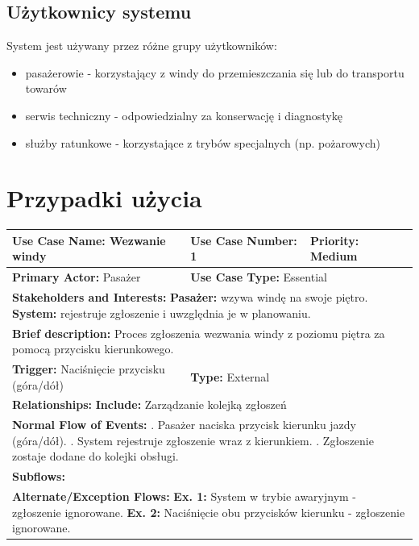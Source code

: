 \documentclass[a4paper,12pt]{article}
\begin{document}
\subsection{Użytkownicy systemu}
System jest używany przez różne grupy użytkowników:
\begin{itemize}
    \item pasażerowie - korzystający z windy do przemieszczania się lub do transportu towarów
    \item serwis techniczny - odpowiedzialny za konserwację i diagnostykę
    \item służby ratunkowe - korzystające z trybów specjalnych (np. pożarowych)
\end{itemize}
\pagebreak
\section{Przypadki użycia}

\begin{table}[h]
\centering
\begin{tabular}{|p{}|p{}|p{}|}
\hline
\textbf{Use Case Name:} Wezwanie windy & \textbf{Use Case Number:} 1 & \textbf{Priority:} Medium \\ \hline
\textbf{Primary Actor:} Pasażer & \multicolumn{2}{l|}{\textbf{Use Case Type:} Essential} \\ \hline
\multicolumn{3}{|p{0.9\textwidth}|}{\textbf{Stakeholders and Interests:} \newline
\textbf{Pasażer:} wzywa windę na swoje piętro. \newline
\textbf{System:} rejestruje zgłoszenie i uwzględnia je w planowaniu.} \\ \hline
\multicolumn{3}{|p{0.9\textwidth}|}{\textbf{Brief description:} Proces zgłoszenia wezwania windy z poziomu piętra za pomocą przycisku kierunkowego.} \\ \hline
\textbf{Trigger:} Naciśnięcie przycisku (góra/dół) & \multicolumn{2}{l|}{\textbf{Type:} External} \\ \hline
\multicolumn{3}{|p{0.9\textwidth}|}{\textbf{Relationships:} \newline
\textbf{Include:} Zarządzanie kolejką zgłoszeń } \\ \hline
\multicolumn{3}{|p{0.9\textwidth}|}{\textbf{Normal Flow of Events:} \newline
1. Pasażer naciska przycisk kierunku jazdy (góra/dół). \newline
2. System rejestruje zgłoszenie wraz z kierunkiem. \newline
3. Zgłoszenie zostaje dodane do kolejki obsługi.} \\ \hline
\multicolumn{3}{|p{0.9\textwidth}|}{\textbf{Subflows:}} \\ \hline
\multicolumn{3}{|p{0.9\textwidth}|}{\textbf{Alternate/Exception Flows:} \newline
\textbf{Ex. 1:} System w trybie awaryjnym - zgłoszenie ignorowane. \newline
\textbf{Ex. 2:} Naciśnięcie obu przycisków kierunku - zgłoszenie ignorowane.} \\ \hline
\end{tabular}
\end{table}
\end{document}
